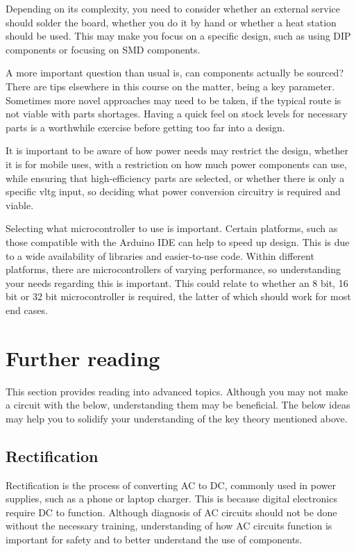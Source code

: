 \documentclass[a4paper,11pt]{report}
\newcommand{\Theory}[1] %
{
\phantomsection %
\todo[inline, color=green!30]{\textbf{#1}} %
\vspace{1em} %
}
\begin{document}
Depending on its complexity, you need to consider whether an external service should solder the board, whether you do it by hand or whether a heat station should be used. This may make you focus on a specific design, such as using DIP components or focusing on SMD components.

A more important question than usual is, can components actually be sourced? There are tips elsewhere in this course on the matter, being a key parameter. Sometimes more novel approaches may need to be taken, if the typical route is not viable with parts shortages. Having a quick feel on stock levels for necessary parts is a worthwhile exercise before getting too far into a design.

It is important to be aware of how power needs may restrict the design, whether it is for mobile uses, with a restriction on how much power components can use, while ensuring that high-efficiency parts are selected, or whether there is only a specific \gls{vltg} input, so deciding what power conversion circuitry is required and viable.

Selecting what microcontroller to use is important. Certain platforms, such as those compatible with the Arduino IDE can help to speed up design. This is due to a wide availability of libraries and easier-to-use code. Within different platforms, there are microcontrollers of varying performance, so understanding your needs regarding this is important. This could relate to whether an 8 bit, 16 bit or 32 bit microcontroller is required, the latter of which should work for most end cases.

\section{Further reading}

This section provides reading into advanced topics. Although you may not make a circuit with the below, understanding them may be beneficial. The below ideas may help you to solidify your understanding of the key theory mentioned above.

\subsection{Rectification}

\Theory{What is Rectification?}

Rectification is the process of converting AC to DC, commonly used in power supplies, such as a phone or laptop charger. This is because digital electronics require DC to function. Although diagnosis of AC circuits should not be done without the necessary training, understanding of how AC circuits function is important for safety and to better understand the use of components.
\end{document}
